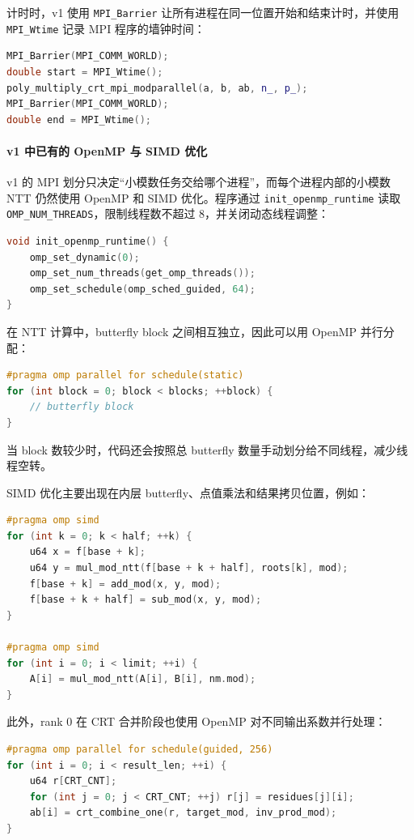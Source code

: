 \documentclass[a4paper]{article}
\begin{document}
计时时，v1 使用 \texttt{MPI\_Barrier} 让所有进程在同一位置开始和结束计时，并使用 \texttt{MPI\_Wtime} 记录 MPI 程序的墙钟时间：
\begin{lstlisting}[language=C++]
MPI_Barrier(MPI_COMM_WORLD);
double start = MPI_Wtime();
poly_multiply_crt_mpi_modparallel(a, b, ab, n_, p_);
MPI_Barrier(MPI_COMM_WORLD);
double end = MPI_Wtime();
\end{lstlisting}

\paragraph{v1 中已有的 OpenMP 与 SIMD 优化}

v1 的 MPI 划分只决定“小模数任务交给哪个进程”，而每个进程内部的小模数 NTT 仍然使用 OpenMP 和 SIMD 优化。程序通过 \texttt{init\_openmp\_runtime} 读取 \texttt{OMP\_NUM\_THREADS}，限制线程数不超过 8，并关闭动态线程调整：
\begin{lstlisting}[language=C++]
void init_openmp_runtime() {
    omp_set_dynamic(0);
    omp_set_num_threads(get_omp_threads());
    omp_set_schedule(omp_sched_guided, 64);
}
\end{lstlisting}

在 NTT 计算中，butterfly block 之间相互独立，因此可以用 OpenMP 并行分配：
\begin{lstlisting}[language=C++]
#pragma omp parallel for schedule(static)
for (int block = 0; block < blocks; ++block) {
    // butterfly block
}
\end{lstlisting}
当 block 数较少时，代码还会按照总 butterfly 数量手动划分给不同线程，减少线程空转。

SIMD 优化主要出现在内层 butterfly、点值乘法和结果拷贝位置，例如：
\begin{lstlisting}[language=C++]
#pragma omp simd
for (int k = 0; k < half; ++k) {
    u64 x = f[base + k];
    u64 y = mul_mod_ntt(f[base + k + half], roots[k], mod);
    f[base + k] = add_mod(x, y, mod);
    f[base + k + half] = sub_mod(x, y, mod);
}

#pragma omp simd
for (int i = 0; i < limit; ++i) {
    A[i] = mul_mod_ntt(A[i], B[i], nm.mod);
}
\end{lstlisting}
此外，rank 0 在 CRT 合并阶段也使用 OpenMP 对不同输出系数并行处理：
\begin{lstlisting}[language=C++]
#pragma omp parallel for schedule(guided, 256)
for (int i = 0; i < result_len; ++i) {
    u64 r[CRT_CNT];
    for (int j = 0; j < CRT_CNT; ++j) r[j] = residues[j][i];
    ab[i] = crt_combine_one(r, target_mod, inv_prod_mod);
}
\end{lstlisting}
\end{document}
